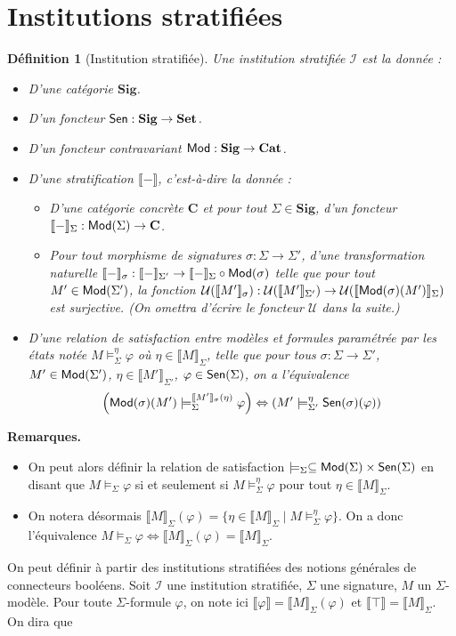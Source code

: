 \documentclass[11pt,a4paper]{report}
\newtheorem{defi}[theo]{Définition}
\newcommand{\ph}{\varphi}
\newcommand{\itemz}{\item[$\triangleright$]}
\newcommand{\gr}{\textbf}
\newcommand{\U}{\mathcal{U}}
\newcommand{\I}{\mathcal{I}}
\renewcommand{\iff}{\Leftrightarrow}
\newcommand{\lb}{\llbracket}
\newcommand{\rb}{\rrbracket}
\newcommand{\info}[1]{\text{{\fontfamily{lmss}\selectfont #1}}}
\newcommand{\Mod}{\info{Mod}}
\newcommand{\Sen}{\info{Sen}}
\newcommand{\1}{\mathbbm{1}}
\begin{document}
\section{Institutions stratifiées}
\begin{defi}[Institution stratifiée]
Une institution stratifiée $\I$ est la donnée :
\begin{itemize}
\setlength\itemsep{-0.3em}
\itemz D'une catégorie $\gr{Sig}$.
\itemz D'un foncteur $\Sen : \gr{Sig} \to \gr{Set}$.
\itemz D'un foncteur contravariant $\Mod : \gr{Sig} \to \gr{Cat}$.
\itemz D'une stratification $\lb - \rb$, c'est-à-dire la donnée : 
\begin{itemize}
\item D'une catégorie concrète $\gr{C}$ et pour tout $\Sigma \in \gr{Sig}$, d'un foncteur $\lb - \rb_\Sigma : \Mod(\Sigma) \to \gr{C}$.
\item Pour tout morphisme de signatures $\sigma : \Sigma \to \Sigma'$, d'une transformation naturelle $\lb - \rb_\sigma : \lb - \rb_{\Sigma'} \to \lb - \rb_\Sigma \circ \Mod(\sigma)$ telle que pour tout $M' \in \Mod(\Sigma')$, la fonction $\U (\lb M' \rb_\sigma) : \U ( \lb M' \rb_{\Sigma'}) \to \U (\lb \Mod(\sigma)(M') \rb_\Sigma )$ est surjective. (On omettra d'écrire le foncteur $\U$ dans la suite.)
\end{itemize}
\itemz D'une relation de satisfaction entre modèles et formules paramétrée par les états notée $M \models_\Sigma^\eta \ph$ où $\eta \in \lb M \rb_\Sigma$, telle que pour tous $\sigma : \Sigma \to \Sigma'$, $M' \in \Mod(\Sigma')$, $\eta \in \lb M' \rb_{\Sigma'}$, $\ph \in \Sen(\Sigma)$, on a l'équivalence
$$ \left(\Mod(\sigma)(M') \models_\Sigma^{\lb M' \rb_\sigma(\eta)} \ph\right) \iff \left(M' \models_{\Sigma'}^\eta \Sen(\sigma)(\ph)\right)$$
\end{itemize}
\end{defi}
\gr{Remarques.}
\begin{itemize}
\setlength\itemsep{-0.3em}
\item On peut alors définir la relation de satisfaction $\models_\Sigma \subseteq \Mod(\Sigma) \times \Sen(\Sigma)$ en disant que $M \models_\Sigma \ph$ si et seulement si $M \models_\Sigma^\eta \ph$ pour tout $\eta \in \lb M \rb_\Sigma$.
\item On notera désormais $\lb M \rb_\Sigma (\ph) = \{ \eta \in \lb M \rb_\Sigma \mid M \models_\Sigma^\eta \ph \}$. On a donc l'équivalence $M \models_\Sigma \ph \iff \lb M \rb_\Sigma (\ph) = \lb M \rb_\Sigma$.
\end{itemize}
On peut définir à partir des institutions stratifiées des notions générales de connecteurs booléens. Soit $\I$ une institution stratifiée, $\Sigma$ une signature, $M$ un $\Sigma$-modèle. Pour toute $\Sigma$-formule $\ph$, on note ici $\lb \ph \rb = \lb M \rb_\Sigma(\ph)$ et $\lb \top \rb = \lb M \rb_\Sigma$. On dira que
\end{document}
